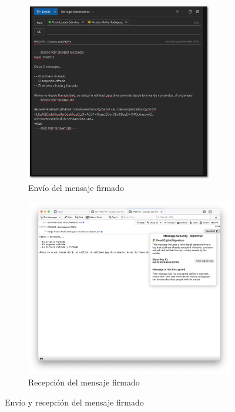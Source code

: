 \begin{figure}[H]
    \centering
    \begin{subfigure}{.5\textwidth}
        \centering
        \includegraphics[width=0.9\textwidth]{outlook-firmado-sombra.png}
        \caption{Envío del mensaje firmado}
    \end{subfigure}%
    \begin{subfigure}{.5\textwidth}
        \centering
        \includegraphics[width=\textwidth]{thunderbird-firmado.png}
        \caption{Recepción del mensaje firmado}
    \end{subfigure}
    \caption{Envío y recepción del mensaje firmado}
\end{figure}

